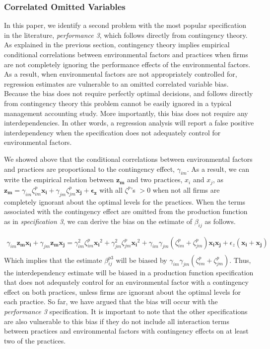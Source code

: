 \documentclass[12pt]{article}
\begin{document}
\subsubsection{Correlated Omitted Variables}

In this paper, we identify a second problem with the most popular specification in the literature, \emph{performance 3}, which follows directly from contingency theory. As explained in the previous section, contingency theory implies empirical conditional correlations between environmental factors and practices when firms are not completely ignoring the performance effects of the environmental factors. As a result, when environmental factors are not appropriately controlled for, regression estimates are vulnerable to an omitted correlated variable bias. Because the bias does not require perfectly optimal decisions, and follows directly from contingency theory this problem cannot be easily ignored in a typical management accounting study. More importantly, this bias does not require any interdependencies. In other words, a regression analysis will report a false positive interdependency when the specification does not adequately control for environmental factors. 

We showed above that the conditional correlations between environmental factors and practices are proportional to the contingency effect, $\gamma_{im}$. As a result, we can write the empirical relation between $\mathbf{z_m}$ and two practices, $x_i$ and $x_j$, as $\mathbf{z_m} = \gamma_{im} \zeta^p_{im} \mathbf{x_i} + \gamma_{jm} \zeta^p_{jm} \mathbf{x_j} + \mathbf{\epsilon_z}$ with all $\zeta^p$'s $>0$ when not all firms are completely ignorant about the optimal levels for the practices.  When the terms associated with the contingency effect are omitted from the production function as in \emph{specification 3}, we can derive the bias on the estimate of $\beta_{ij}$ as follows.

\begin{align*}
\gamma_{im} \mathbf{z_m} \mathbf{x_i} + \gamma_{jm} \mathbf{z_m} \mathbf{x_j}
= \gamma^2_{im} \zeta^p_{im} \mathbf{x_i}^2 + \gamma^2_{jm} \zeta^p_{jm} \mathbf{x_i}^2 
    + \gamma_{im} \gamma_{jm} (\zeta^p_{im} + \zeta^p_{jm}) \mathbf{x_i x_j} 
    + \epsilon_z ( \mathbf{x_i} + \mathbf{x_j})\\
\end{align*}
Which implies that the estimate $\beta^{p3}_{ij}$ will be biased by $\gamma_{im} \gamma_{jm}(\zeta^p_{im} + \zeta^p_{jm})$. Thus, the interdependency estimate will be biased in a production function specification that does not adequately control for an environmental factor with a contingency effect on both practices, unless firms are ignorant about the optimal levels for each practice. So far, we have argued that the bias will occur with the \emph{performance 3} specification. It is important to note that the other specifications are also vulnerable to this bias if they do not include all interaction terms between practices and environmental factors with contingency effects on at least two of the practices. 
\end{document}
